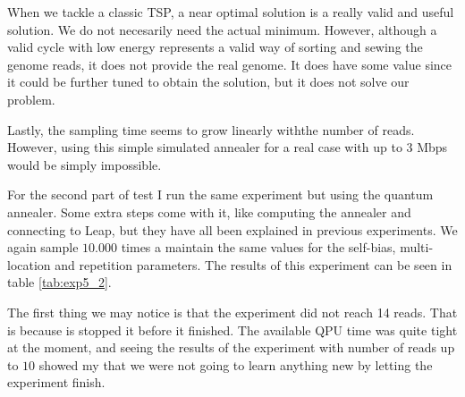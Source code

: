 When we tackle a classic TSP, a near optimal solution is a really valid and useful solution. We do not necesarily need the actual minimum. However, although a valid cycle with low energy represents a valid way of sorting and sewing the genome reads, it does not provide the real genome. It does have some value since it could be further tuned to obtain the solution, but it does not solve our problem.

Lastly, the sampling time seems to grow linearly withthe number of reads. However, using this simple simulated annealer for a real case with up to 3 Mbps would be simply impossible.

For the second part of test  I run the same experiment but using the quantum annealer. Some extra steps come with it, like computing the annealer and connecting to Leap, but they have all been explained in previous experiments. We again sample $10.000$ times a maintain the same values for the self-bias, multi-location and repetition parameters. The results of this experiment can be seen in table \ref{tab:exp5_2}.

\begin{table}[H]
	\centering
	\caption{Results of experiment 5, $10.000$ reads using the quantum annealer.}
	\label{tab:exp5_2}
\end{table}

The first thing we may notice is that the experiment did not reach 14 reads. That is because is stopped it before it finished. The available QPU time was quite tight at the moment, and seeing the results of the experiment with number of reads up to $10$ showed my that we were not going to learn anything new by letting the experiment finish.

